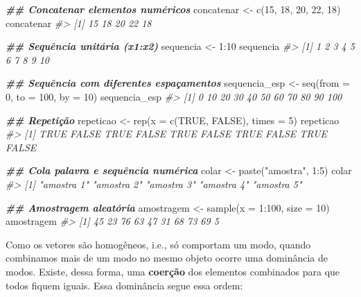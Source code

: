 \documentclass[
]{book}
\newenvironment{Shaded}{\begin{snugshade}}{\end{snugshade}}
\newcommand{\AttributeTok}[1]{\textcolor[rgb]{0.61,0.61,0.61}{#1}}
\newcommand{\CommentTok}[1]{\textcolor[rgb]{0.37,0.37,0.37}{\textit{#1}}}
\newcommand{\ConstantTok}[1]{\textcolor[rgb]{0,0,0}{#1}}
\newcommand{\DecValTok}[1]{\textcolor[rgb]{0.06,0.06,0.06}{#1}}
\newcommand{\DocumentationTok}[1]{\textcolor[rgb]{0.37,0.37,0.37}{\textbf{\textit{#1}}}}
\newcommand{\FunctionTok}[1]{\textcolor[rgb]{0,0,0}{#1}}
\newcommand{\NormalTok}[1]{#1}
\newcommand{\OtherTok}[1]{\textcolor[rgb]{0.37,0.37,0.37}{#1}}
\newcommand{\SpecialCharTok}[1]{\textcolor[rgb]{0,0,0}{#1}}
\newcommand{\StringTok}[1]{\textcolor[rgb]{0.5,0.5,0.5}{#1}}
\begin{document}
\begin{Shaded}
\begin{Highlighting}[]
\DocumentationTok{\#\# Concatenar elementos numéricos}
\NormalTok{concatenar }\OtherTok{\textless{}{-}} \FunctionTok{c}\NormalTok{(}\DecValTok{15}\NormalTok{, }\DecValTok{18}\NormalTok{, }\DecValTok{20}\NormalTok{, }\DecValTok{22}\NormalTok{, }\DecValTok{18}\NormalTok{)}
\NormalTok{concatenar}
\CommentTok{\#\textgreater{} [1] 15 18 20 22 18}

\DocumentationTok{\#\# Sequência unitária (x1:x2)}
\NormalTok{sequencia }\OtherTok{\textless{}{-}} \DecValTok{1}\SpecialCharTok{:}\DecValTok{10}
\NormalTok{sequencia}
\CommentTok{\#\textgreater{}  [1]  1  2  3  4  5  6  7  8  9 10}

\DocumentationTok{\#\# Sequência com diferentes espaçamentos }
\NormalTok{sequencia\_esp }\OtherTok{\textless{}{-}} \FunctionTok{seq}\NormalTok{(}\AttributeTok{from =} \DecValTok{0}\NormalTok{, }\AttributeTok{to =} \DecValTok{100}\NormalTok{, }\AttributeTok{by =} \DecValTok{10}\NormalTok{) }
\NormalTok{sequencia\_esp}
\CommentTok{\#\textgreater{}  [1]   0  10  20  30  40  50  60  70  80  90 100}

\DocumentationTok{\#\# Repetição}
\NormalTok{repeticao }\OtherTok{\textless{}{-}} \FunctionTok{rep}\NormalTok{(}\AttributeTok{x =} \FunctionTok{c}\NormalTok{(}\ConstantTok{TRUE}\NormalTok{, }\ConstantTok{FALSE}\NormalTok{), }\AttributeTok{times =} \DecValTok{5}\NormalTok{)}
\NormalTok{repeticao}
\CommentTok{\#\textgreater{}  [1]  TRUE FALSE  TRUE FALSE  TRUE FALSE  TRUE FALSE  TRUE FALSE}

\DocumentationTok{\#\# Cola palavra e sequência numérica}
\NormalTok{colar }\OtherTok{\textless{}{-}} \FunctionTok{paste}\NormalTok{(}\StringTok{"amostra"}\NormalTok{, }\DecValTok{1}\SpecialCharTok{:}\DecValTok{5}\NormalTok{)}
\NormalTok{colar}
\CommentTok{\#\textgreater{} [1] "amostra 1" "amostra 2" "amostra 3" "amostra 4" "amostra 5"}

\DocumentationTok{\#\# Amostragem aleatória}
\NormalTok{amostragem }\OtherTok{\textless{}{-}} \FunctionTok{sample}\NormalTok{(}\AttributeTok{x =} \DecValTok{1}\SpecialCharTok{:}\DecValTok{100}\NormalTok{, }\AttributeTok{size =} \DecValTok{10}\NormalTok{)}
\NormalTok{amostragem}
\CommentTok{\#\textgreater{}  [1] 45 23 76 63 47 31 68 73 69  5}
\end{Highlighting}
\end{Shaded}

Como os vetores são homogêneos, i.e., só comportam um modo, quando combinamos mais de um modo no mesmo objeto ocorre uma dominância de modos. Existe, dessa forma, uma \textbf{coerção} dos elementos combinados para que todos fiquem iguais. Essa dominância segue essa ordem:
\end{document}
